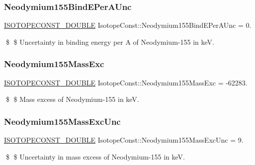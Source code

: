 \subsubsection{\texorpdfstring{Neodymium155\+Bind\+E\+Per\+A\+Unc}{Neodymium155BindEPerAUnc}}
{\footnotesize\ttfamily \mbox{\hyperlink{group___isotope_const-_macros_ga8f45a7272ce02c0b4c65c44636ed719a}{I\+S\+O\+T\+O\+P\+E\+C\+O\+N\+S\+T\+\_\+\+D\+O\+U\+B\+LE}} Isotope\+Const\+::\+Neodymium155\+Bind\+E\+Per\+A\+Unc = 0.}

\$ \$ Uncertainty in binding energy per A of Neodymium-\/155 in keV. \mbox{\label{group___isotope_const-_neodymium-_nd155_ga306d8b887579a00f3a9a91f344709069}} 
\subsubsection{\texorpdfstring{Neodymium155\+Mass\+Exc}{Neodymium155MassExc}}
{\footnotesize\ttfamily \mbox{\hyperlink{group___isotope_const-_macros_ga8f45a7272ce02c0b4c65c44636ed719a}{I\+S\+O\+T\+O\+P\+E\+C\+O\+N\+S\+T\+\_\+\+D\+O\+U\+B\+LE}} Isotope\+Const\+::\+Neodymium155\+Mass\+Exc = -\/62283.}

\$ \$ Mass excess of Neodymium-\/155 in keV. \mbox{\label{group___isotope_const-_neodymium-_nd155_gaa559079c1c912903687fdee3697ebd5b}} 
\subsubsection{\texorpdfstring{Neodymium155\+Mass\+Exc\+Unc}{Neodymium155MassExcUnc}}
{\footnotesize\ttfamily \mbox{\hyperlink{group___isotope_const-_macros_ga8f45a7272ce02c0b4c65c44636ed719a}{I\+S\+O\+T\+O\+P\+E\+C\+O\+N\+S\+T\+\_\+\+D\+O\+U\+B\+LE}} Isotope\+Const\+::\+Neodymium155\+Mass\+Exc\+Unc = 9.}

\$ \$ Uncertainty in mass excess of Neodymium-\/155 in keV. \mbox{\label{group___isotope_const-_neodymium-_nd155_gaee9c50b261495edc17198dd1b78ea5dc}} 
